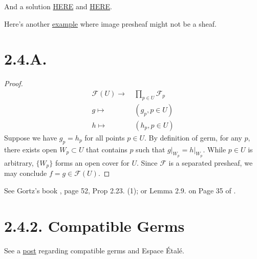 And a solution \href{https://math.mit.edu/~mckernan/Teaching/09-10/Autumn/18.725/model5.pdf}{HERE} and \href{https://metaphor.ethz.ch/x/2017/fs/401-3146-12L/ex/SolSheet5.pdf}{HERE}.

Here's another \href{https://www.kth.se/polopoly_fs/1.291614.1550158503!/Menu/general/column-content/attachment/Lecture1AlgGeo.pdf}{example} where image presheaf might not be a sheaf.


\section{2.4.A.}\label{2.4.A.}

\begin{proof}
	\begin{align}
		\mathscr F(U)\to&~ \prod_{p\in U}\mathscr F_p \\
			g\mapsto&~ (g_p,p\in U)\\
			h\mapsto&~ (h_p,p\in U)
	\end{align}
	Suppose we have $g_p=h_p$ for all points $p\in U$. By definition of germ, for any $p$, there exists open $W_p\subset U$ that contains $p$ such that $g\vert_{W_p}=h\vert_{W_p}$. While $p\in U$ is arbitrary, $\{W_p\}$ forms an open cover for $U$. Since $\mathscr F$ is a separated presheaf, we may conclude $f=g\in\mathscr F(U)$.
\end{proof}

\begin{remark}
See G\;ortz's book \cite{gortz2020algebraic}, page 52, Prop 2.23. (1); or Lemma 2.9. on Page 35 of \cite{qing2006algebraic}. 
\end{remark}


\section{2.4.2. Compatible Germs}\label{2.4.2.}

See a \href{https://math.stackexchange.com/questions/2042363/compatible-germs-and-the-espace-étalé}{post} regarding compatible germs and Espace \'Etal\'e.

